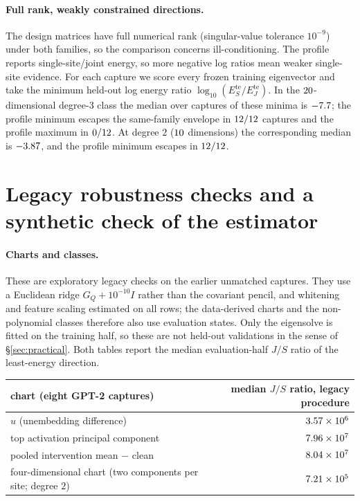 \paragraph{Full rank, weakly constrained directions.} The design matrices have full numerical rank (singular-value
tolerance $10^{-9}$) under both families, so the comparison concerns ill-conditioning. The profile reports
single-site/joint energy, so more negative log ratios mean weaker single-site evidence. For each capture we score every
frozen training eigenvector and take the minimum held-out log energy ratio $\log_{10}(E_S^{\mathrm{te}}/E_J^{\mathrm{te}})$. In the
$20$-dimensional degree-3 class the median over captures of these minima is $-7.7$;
the profile minimum escapes the same-family envelope in $12/12$ captures and the profile maximum in
$0/12$. At degree $2$ ($10$ dimensions) the corresponding median is
$-3.87$, and the profile minimum escapes in $12/12$.

\section{Legacy robustness checks and a synthetic check of the estimator}
\label{app:robust}

\paragraph{Charts and classes.} These are exploratory legacy checks on the earlier unmatched captures. They use a
Euclidean ridge $G_Q+10^{-10}I$ rather than the covariant pencil, and whitening and feature scaling estimated on all
rows; the data-derived charts and the non-polynomial classes therefore also use evaluation states. Only the
eigensolve is fitted on the training half, so these are not held-out validations in the sense of
\S\ref{sec:practical}. Both tables report the median evaluation-half $J/S$ ratio of the least-energy direction.

\begin{center}\small
\begin{tabular}{lr}
\toprule
chart (eight GPT-2 captures) & median $J/S$ ratio, legacy procedure \\
\midrule
$u$ (unembedding difference) & $3.57\times10^{6}$ \\
top activation principal component & $7.96\times10^{7}$ \\
pooled intervention mean $-$ clean & $8.04\times10^{7}$ \\
four-dimensional chart (two components per site; degree $2$) & $7.21\times10^{5}$ \\
\bottomrule
\end{tabular}
\end{center}

